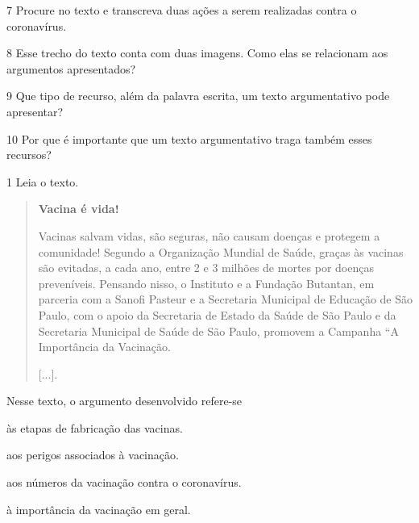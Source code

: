 \num{7} Procure no texto e transcreva duas ações a serem realizadas contra o
coronavírus.



\num{8} Esse trecho do texto conta com duas imagens. Como elas se
relacionam aos argumentos apresentados?


\num{9} Que tipo de recurso, além da palavra escrita, um texto argumentativo
pode apresentar?



\num{10} Por que é importante que um texto argumentativo traga também esses recursos?




\num{1} Leia o texto.

\begin{quote}
\textbf{Vacina é vida!}

Vacinas salvam vidas, são seguras, não causam doenças e protegem a
comunidade! Segundo a Organização Mundial de Saúde, graças às vacinas
são evitadas, a cada ano, entre 2 e 3 milhões de mortes por doenças
preveníveis. Pensando nisso, o Instituto e a Fundação Butantan, em
parceria com a Sanofi Pasteur e a Secretaria Municipal de Educação de
São Paulo, com o apoio da Secretaria de Estado da Saúde de São Paulo e
da Secretaria Municipal de Saúde de São Paulo, promovem a Campanha “A
Importância da Vacinação.

{[}...{]}.

\end{quote}

Nesse texto, o argumento desenvolvido refere-se

\begin{escolha}
\item às etapas de fabricação das vacinas.

\item aos perigos associados à vacinação.

\item aos números da vacinação contra o coronavírus.

\item à importância da vacinação em geral.
\end{escolha}

